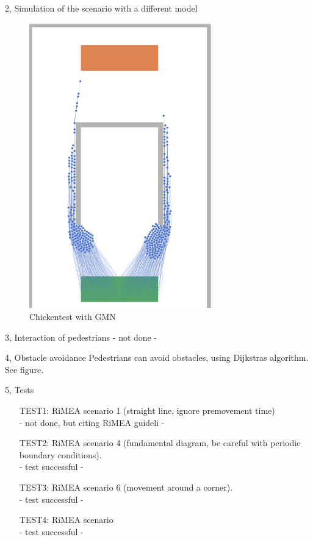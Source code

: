 \documentclass[10pt,a4paper]{article}
\begin{document}
\begin{task}{2, Simulation of the scenario with a different model}
\begin{itemize}
    \begin{figure}[H]
        \centering
        \includegraphics[width=0.7\textwidth]{pictures/gnm/chicken.png}
        \caption{Chickentest with GMN}
        \label{fig:chickentest_gnm}
    \end{figure}
\end{itemize}

\end{task}

\begin{task}{3, Interaction of pedestrians}
- not done -
\end{task}
\begin{task}{4, Obstacle avoidance}
Pedestrians can avoid obstacles, using Dijkstras algorithm. See figure.
\end{task}
\begin{task}{5, Tests}
\begin{enumerate}
\item[TEST1:] RiMEA scenario 1 (straight line, ignore premovement time)\\
- not done, but citing RiMEA guideli -
\item[TEST2:] RiMEA scenario 4 (fundamental diagram, be careful with periodic boundary conditions).\\
- test successful - 
\item[TEST3:] RiMEA scenario 6 (movement around a corner).\\
- test successful - 
\item[TEST4:] RiMEA scenario\\
- test successful - 
\end{enumerate}
\end{task}



\end{document}
